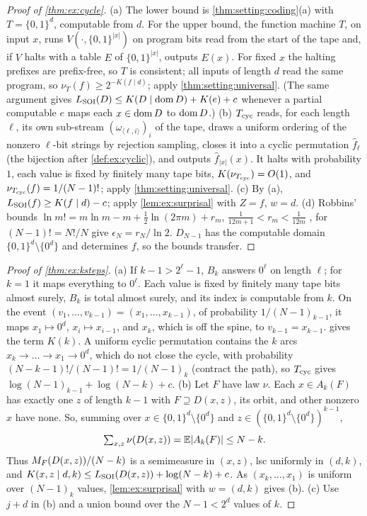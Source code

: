 \begin{proof}[Proof of \cref{thm:ex:cycle}]
(a) The lower bound is \cref{thm:setting:coding}(a) with $T=\{0,1\}^d$, computable from $d$. For the upper bound, the function machine $T$, on input $x$, runs $V(\cdot,\{0,1\}^{|x|})$ on program bits read from the start of the tape and, if $V$ halts with a table $E$ of $\{0,1\}^{|x|}$, outputs $E(x)$. For fixed $x$ the halting prefixes are prefix-free, so $T$ is consistent; all inputs of length $d$ read the same program, so $\nu_T(f)\ge2^{-K(f\mid d)}$; apply \cref{thm:setting:universal}. (The same argument gives $L_{\mathrm{SOI}}(D)\le K(D\mid\operatorname{dom} D)+K(e)+c$ whenever a partial computable $e$ maps each $x\in\operatorname{dom} D$ to $\operatorname{dom} D$.)
(b) $T_{\rm cyc}$ reads, for each length $\ell$, its own sub-stream $(\omega_{\langle\ell,i\rangle})_i$ of the tape, draws a uniform ordering of the nonzero $\ell$-bit strings by rejection sampling, closes it into a cyclic permutation $\hat f_\ell$ (the bijection after \cref{def:ex:cyclic}), and outputs $\hat f_{|x|}(x)$. It halts with probability $1$, each value is fixed by finitely many tape bits, $K(\nu_{T_{\rm cyc}})=O(1)$, and $\nu_{T_{\rm cyc}}(f)=1/(N-1)!$; apply \cref{thm:setting:universal}.
(c) By (a), $L_{\mathrm{SOI}}(f)\ge K(f\mid d)-c$; apply \cref{lem:ex:surprisal} with $Z=f$, $w=d$.
(d) Robbins' bounds $\ln m!=m\ln m-m+\frac12\ln(2\pi m)+r_m$, $\frac1{12m+1}<r_m<\frac1{12m}$ \citep{robbins1955remark}, for $(N-1)!=N!/N$ give $\epsilon_N=r_N/\ln2$.
$D_{N-1}$ has the computable domain $\{0,1\}^d\setminus\{0^d\}$ and determines $f$, so the bounds transfer.
\end{proof}

\begin{proof}[Proof of \cref{thm:ex:ksteps}]
(a) If $k-1>2^\ell-1$, $B_k$ answers $0^\ell$ on length $\ell$; for $k=1$ it maps everything to $0^\ell$. Each value is fixed by finitely many tape bits almost surely, $B_k$ is total almost surely, and its index is computable from $k$. On the event $(v_1,\dots,v_{k-1})=(x_1,\dots,x_{k-1})$, of probability $1/(N-1)_{k-1}$, it maps $x_1\mapsto0^d$, $x_i\mapsto x_{i-1}$, and $x_k$, which is off the spine, to $v_{k-1}=x_{k-1}$.  gives the term $K(k)$. A uniform cyclic permutation contains the $k$ arcs $x_k\to\dots\to x_1\to0^d$, which do not close the cycle, with probability $(N-k-1)!/(N-1)!=1/(N-1)_k$ (contract the path), so $T_{\rm cyc}$ gives $\log(N-1)_{k-1}+\log(N-k)+c$.
(b) Let $F$ have law $\nu$. Each $x\in A_k(F)$ has exactly one $z$ of length $k-1$ with $F\supseteq D(x,z)$, its orbit, and other nonzero $x$ have none. So, summing over $x\in\{0,1\}^d\setminus\{0^d\}$ and $z\in(\{0,1\}^d\setminus\{0^d\})^{k-1}$,
\begin{equation}\label{eq:ex:depth}
\textstyle\sum_{x,z}\nu(D(x,z))=\mathbb{E}|A_k(F)|\le N-k .
\end{equation}
Thus $M_{F}(D(x,z))/(N-k)$ is a semimeasure in $(x,z)$, lsc uniformly in $(d,k)$, and $K(x,z\mid d,k)\le L_{\mathrm{SOI}}(D(x,z))+\log(N-k)+c$. As $(x_k,\dots,x_1)$ is uniform over $(N-1)_k$ values, \cref{lem:ex:surprisal} with $w=(d,k)$ gives (b).
(c) Use $j+d$ in (b) and a union bound over the $N-1<2^d$ values of $k$.
\end{proof}

